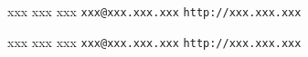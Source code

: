 











\References




{

\bigskip\obeylines
xxx
xxx
xxx
{\tt xxx@xxx.xxx.xxx}
{\tt http://xxx.xxx.xxx}

\bigskip
xxx
xxx
xxx
{\tt xxx@xxx.xxx.xxx}
{\tt http://xxx.xxx.xxx}


}

\bye

